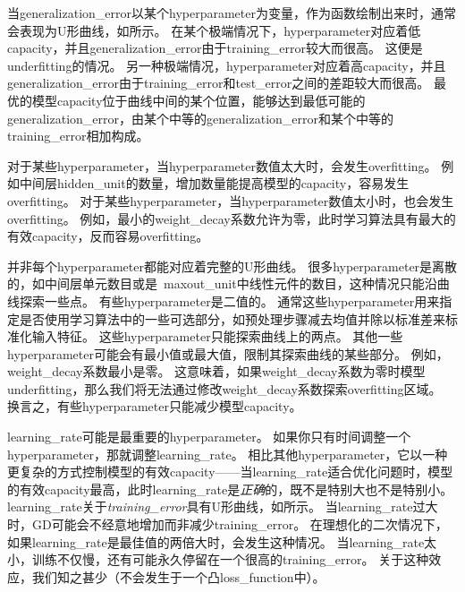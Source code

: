 

当\gls{generalization_error}以某个\gls{hyperparameter}为变量，作为函数绘制出来时，通常会表现为U形曲线，如所示。
在某个极端情况下，\gls{hyperparameter}对应着低\gls{capacity}，并且\gls{generalization_error}由于\gls{training_error}较大而很高。
这便是\gls{underfitting}的情况。
另一种极端情况，\gls{hyperparameter}对应着高\gls{capacity}，并且\gls{generalization_error}由于\gls{training_error}和\gls{test_error}之间的差距较大而很高。
最优的模型\gls{capacity}位于曲线中间的某个位置，能够达到最低可能的\gls{generalization_error}，由某个中等的\gls{generalization_error}和某个中等的\gls{training_error}相加构成。



对于某些\gls{hyperparameter}，当\gls{hyperparameter}数值太大时，会发生\gls{overfitting}。
例如中间层\gls{hidden_unit}的数量，增加数量能提高模型的\gls{capacity}，容易发生\gls{overfitting}。%
对于某些\gls{hyperparameter}，当\gls{hyperparameter}数值太小时，也会发生\gls{overfitting}。
例如，最小的\gls{weight_decay}系数允许为零，此时学习算法具有最大的有效\gls{capacity}，反而容易\gls{overfitting}。%


并非每个\gls{hyperparameter}都能对应着完整的U形曲线。
很多\gls{hyperparameter}是离散的，如中间层单元数目或是~\gls{maxout_unit}中线性元件的数目，这种情况只能沿曲线探索一些点。
有些\gls{hyperparameter}是二值的。
通常这些\gls{hyperparameter}用来指定是否使用学习算法中的一些可选部分，如预处理步骤减去均值并除以标准差来标准化输入特征。
这些\gls{hyperparameter}只能探索曲线上的两点。
其他一些\gls{hyperparameter}可能会有最小值或最大值，限制其探索曲线的某些部分。%
例如，\gls{weight_decay}系数最小是零。
这意味着，如果\gls{weight_decay}系数为零时模型\gls{underfitting}，那么我们将无法通过修改\gls{weight_decay}系数探索\gls{overfitting}区域。
换言之，有些\gls{hyperparameter}只能减少模型\gls{capacity}。


\gls{learning_rate}可能是最重要的\gls{hyperparameter}。
如果你只有时间调整一个\gls{hyperparameter}，那就调整\gls{learning_rate}。
相比其他\gls{hyperparameter}，它以一种更复杂的方式控制模型的有效\gls{capacity}——当\gls{learning_rate}适合优化问题时，模型的有效\gls{capacity}最高，此时\gls{learning_rate}是\emph{正确}的，既不是特别大也不是特别小。
\gls{learning_rate}关于\emph{\gls{training_error}}具有U形曲线，如所示。
当\gls{learning_rate}过大时，\gls{GD}可能会不经意地增加而非减少\gls{training_error}。
在理想化的二次情况下，如果\gls{learning_rate}是最佳值的两倍大时，会发生这种情况\citep{LeCun+98backprop-small}。
当\gls{learning_rate}太小，训练不仅慢，还有可能永久停留在一个很高的\gls{training_error}。
关于这种效应，我们知之甚少（不会发生于一个凸\gls{loss_function}中）。

